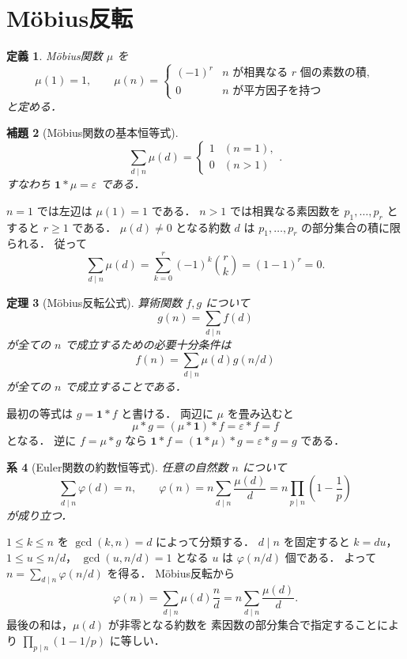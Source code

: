 \documentclass[a5paper,10pt,onecolumn]{jsarticle}
\makeatletter
\theoremstyle{mathnotetheorem}
\newtheorem{theorem}{定理}[section]
\newtheorem{definition}[theorem]{定義}
\newtheorem{lemma}[theorem]{補題}
\newtheorem{corollary}[theorem]{系}
\renewcommand{\proofname}{証明}
\renewenvironment{proof}[1][\proofname]{%
  \par\pushQED{\qed}\normalfont\topsep4\p@\@plus2\p@\relax
  \trivlist\item[\hskip\labelsep\bfseries #1]\ignorespaces
}{\popQED\endtrivlist\@endpefalse}
\makeatother
\begin{document}
\section{M\"obius反転}

\begin{definition}
\emph{M\"obius関数} $\mu$ を
\[
 \mu(1)=1,\qquad
 \mu(n)=\begin{cases}
 (-1)^r&\text{$n$ が相異なる $r$ 個の素数の積},\\
 0&\text{$n$ が平方因子を持つ}
 \end{cases}
\]
と定める．
\end{definition}

\begin{lemma}[M\"obius関数の基本恒等式]\label{lem:mu}
\[
 \sum_{d\mid n}\mu(d)
 =\begin{cases}1&(n=1),\\0&(n>1)\end{cases}.
\]
すなわち $\mathbf1*\mu=\varepsilon$ である．
\end{lemma}
\begin{proof}
$n=1$ では左辺は $\mu(1)=1$ である．
$n>1$ では相異なる素因数を
$p_1,\ldots,p_r$ とすると $r\ge1$ である．
$\mu(d)\ne0$ となる約数 $d$ は
$p_1,\ldots,p_r$ の部分集合の積に限られる．
従って
\[
 \sum_{d\mid n}\mu(d)
 =\sum_{k=0}^r(-1)^k\binom rk
 =(1-1)^r=0.
\]
\end{proof}

\begin{theorem}[M\"obius反転公式]\label{thm:mobius}
算術関数 $f,g$ について
\[
 g(n)=\sum_{d\mid n}f(d)
\]
が全ての $n$ で成立するための必要十分条件は
\[
 f(n)=\sum_{d\mid n}\mu(d)g(n/d)
\]
が全ての $n$ で成立することである．
\end{theorem}
\begin{proof}
最初の等式は $g=\mathbf1*f$ と書ける．
両辺に $\mu$ を畳み込むと
\[
 \mu*g=(\mu*\mathbf1)*f
 =\varepsilon*f=f
\]
となる．
逆に $f=\mu*g$ なら
$\mathbf1*f=(\mathbf1*\mu)*g
 =\varepsilon*g=g$ である．
\end{proof}

\begin{corollary}[Euler関数の約数恒等式]\label{cor:phi}
任意の自然数 $n$ について
\[
 \sum_{d\mid n}\varphi(d)=n,\qquad
 \varphi(n)=n\sum_{d\mid n}\frac{\mu(d)}d
 =n\prod_{p\mid n}\left(1-\frac1p\right)
\]
が成り立つ．
\end{corollary}
\begin{proof}
$1\le k\le n$ を $\gcd(k,n)=d$ によって分類する．
$d\mid n$ を固定すると
$k=du$，$1\le u\le n/d$，
$\gcd(u,n/d)=1$ となる $u$ は
$\varphi(n/d)$ 個である．
よって $n=\sum_{d\mid n}\varphi(n/d)$ を得る．
M\"obius反転から
\[
 \varphi(n)=\sum_{d\mid n}\mu(d)\frac nd
 =n\sum_{d\mid n}\frac{\mu(d)}d.
\]
最後の和は，$\mu(d)$ が非零となる約数を
素因数の部分集合で指定することにより
$\prod_{p\mid n}(1-1/p)$ に等しい．
\end{proof}
\end{document}
